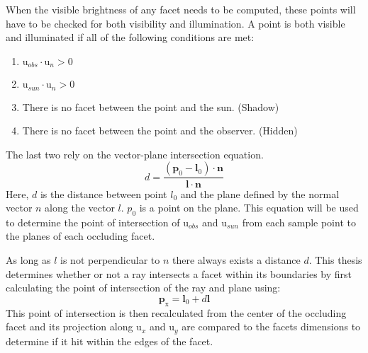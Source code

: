 When the visible brightness of any facet needs to be computed, these points will have to be checked for both visibility and illumination. A point is both visible and illuminated if all of the following conditions are met:
\begin{enumerate}
	\item $\bm{\mathrm{u}}_{obs}\cdotp \mathrm{u}_n > 0$
	\item $\bm{\mathrm{u}}_{sun}\cdotp \mathrm{u}_n > 0$
	\item There is no facet between the point and the sun. (Shadow)
	\item There is no facet between the point and the observer. (Hidden)
\end{enumerate}	
The last two rely on the vector-plane intersection equation.
\begin{equation}\label{eq:ray_distance}
d = \frac{(\bm{p}_0 - \bm{l}_0)\cdotp \bm{n}}{\bm{l}\cdotp \bm{n}}
\end{equation}
Here, $d$ is the distance between point $l_0$ and the plane defined by the normal vector $n$ along the vector $l$. $p_0$ is a point on the plane. This equation will be used to determine the point of intersection of $\bm{\mathrm{u}}_{obs}$ and $\bm{\mathrm{u}}_{sun}$ from each sample point to the planes of each occluding facet.

As long as $l$ is not perpendicular to $n$ there always exists a distance $d$. This thesis determines whether or not a ray intersects a facet within its boundaries by first calculating the point of intersection of the ray and plane using:
\begin{equation}\label{eq:intersection_pt}
\bm{p}_{\mathrm{x}} = \bm{l}_0 + d\bm{l}
\end{equation}
This point of intersection is then recalculated from the center of the occluding facet and its projection along $\bm{\mathrm{u}}_x$ and $\bm{\mathrm{u}}_y$ are compared to the facets dimensions to determine if it hit within the edges of the facet.

